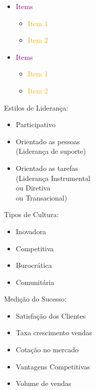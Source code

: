 \begin{itemize}
	\setlength\itemsep{-0.5em}
	\item \textcolor{purple}{Items}
	\begin{itemize}
		\setlength\itemsep{-0.3em}
		\item \textcolor{orange}{Item 1}
		\item \textcolor{orange}{Item 2}
	\end{itemize}
	\item \textcolor{purple}{Items}
	\begin{itemize}
		\setlength\itemsep{-0.3em}
		\item \textcolor{orange}{Item 1}
		\item \textcolor{orange}{Item 2}
	\end{itemize}
\end{itemize}
\begin{minipage}[t]{.40\linewidth}
	\quad Estilos de Liderança:
	\begin{itemize}
		\setlength\itemsep{-0.3em}
		\item Participativo
		\item Orientado as pessoas\\
		(Liderança de suporte)
		\item Orientado as tarefas\\
		(Liderança Instrumental\\ ou Diretiva\\ ou Transacional)
	\end{itemize}
\end{minipage}
\begin{minipage}[t]{.30\linewidth}
	\quad Tipos de Cultura:
	\begin{itemize}
		\setlength\itemsep{-0.3em}
		\item Inovadora
		\item Competitiva
		\item Burocrática
		\item Comunitária
	\end{itemize}
\end{minipage}
\begin{minipage}[t]{.40\linewidth}
	\quad Medição do Sucesso:
	\begin{itemize}
		\setlength\itemsep{-0.3em}
		\item Satisfação dos Clientes
		\item Taxa crescimento vendas
		\item Cotação no mercado
		\item Vantagens Competitivas
		\item Volume de vendas
	\end{itemize}
\end{minipage}
